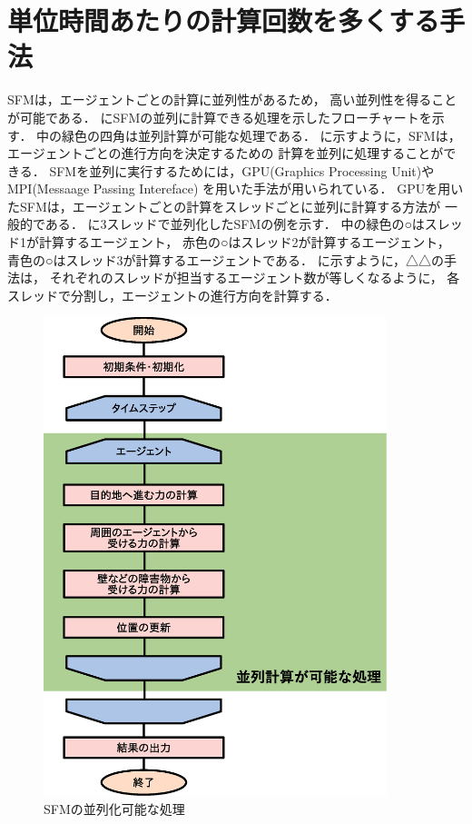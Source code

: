 \section{単位時間あたりの計算回数を多くする手法}
SFMは，エージェントごとの計算に並列性があるため，
高い並列性を得ることが可能である．
にSFMの並列に計算できる処理を示したフローチャートを示す．
中の緑色の四角は並列計算が可能な処理である．
に示すように，SFMは，エージェントごとの進行方向を決定するための
計算を並列に処理することができる．
SFMを並列に実行するためには，GPU(Graphics Processing Unit)やMPI(Messaage Passing Intereface)
を用いた手法が用いられている．
GPUを用いたSFMは，エージェントごとの計算をスレッドごとに並列に計算する方法が
一般的である\cite{seru_sfm1}\cite{seru_sfm2}．
に3スレッドで並列化したSFMの例を示す．
中の緑色の○はスレッド1が計算するエージェント，
赤色の○はスレッド2が計算するエージェント，
青色の○はスレッド3が計算するエージェントである．
に示すように，△△の手法は，
それぞれのスレッドが担当するエージェント数が等しくなるように，
各スレッドで分割し，エージェントの進行方向を計算する．


\begin{figure}[hp]
 \begin{center}
  \includegraphics[width=10cm,clip]{figure/heiretuka_sfm.eps}
  \caption{SFMの並列化可能な処理}
  \label{fig:sfm_heiretu}
 \end{center}
\end{figure}

